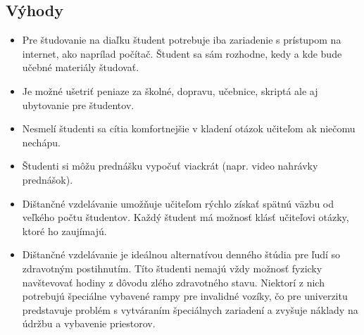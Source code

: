 \documentclass[10pt,oneside,slovak,a4paper]{article}
\begin{document}
\subsection{Výhody}
\begin{itemize}
	\item Pre študovanie na diaľku študent potrebuje iba zariadenie s prístupom na internet, ako naprílad počítač. Študent sa sám rozhodne, kedy a kde bude učebné materiály študovať.
	\item Je možné ušetriť peniaze za školné, dopravu, učebnice, skriptá ale aj ubytovanie pre študentov.
	\item Nesmelí študenti sa cítia komfortnejšie v kladení otázok učiteľom ak niečomu nechápu.
	\item Študenti si môžu prednášku vypočuť viackrát (napr. video nahrávky prednášok).
	\item Dištančné vzdelávanie umožňuje učiteľom rýchlo získať spätnú väzbu od veľkého počtu študentov. Každý študent má možnosť klásť učiteľovi otázky, ktoré ho zaujímajú.
	\item Dištančné vzdelávanie je ideálnou alternatívou denného štúdia pre ľudí so zdravotným postihnutím. Títo študenti nemajú vždy možnosť fyzicky navštevovať hodiny z dôvodu zlého zdravotného stavu. Niektorí z nich potrebujú špeciálne vybavené rampy pre invalidné vozíky, čo pre univerzitu predstavuje problém s vytváraním špeciálnych zariadení a zvyšuje náklady na údržbu a vybavenie priestorov.


\end{itemize}
\end{document}
